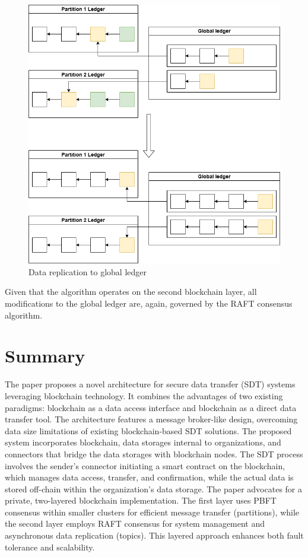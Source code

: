 \documentclass[10pt]{llncs}
\begin{document}
\begin{figure}
    \includegraphics[width=\textwidth]{global-and-local-ledgers.png}
    \caption{Data replication to global ledger} \label{global-and-local-ledgers}
\end{figure}

Given that the algorithm operates on the second blockchain layer, all modifications to the global ledger are, again, governed by the RAFT consensus algorithm.

\section{Summary} \label{summary}

The paper proposes a novel architecture for secure data transfer (SDT) systems leveraging blockchain technology.
It combines the advantages of two existing paradigms: blockchain as a data access interface and blockchain as a direct data transfer tool.
The architecture features a message broker-like design, overcoming data size limitations of existing blockchain-based SDT solutions.
The proposed system incorporates blockchain, data storages internal to organizations, and connectors that bridge the data storages with blockchain nodes.
The SDT process involves the sender's connector initiating a smart contract on the blockchain, which manages data access, transfer, and confirmation, while the actual data is stored off-chain within the organization's data storage. The paper advocates for a private, two-layered blockchain implementation.
The first layer uses PBFT consensus within smaller clusters for efficient message transfer (partitions), while the second layer employs RAFT consensus for system management and asynchronous data replication (topics).
This layered approach enhances both fault tolerance and scalability.
\end{document}
